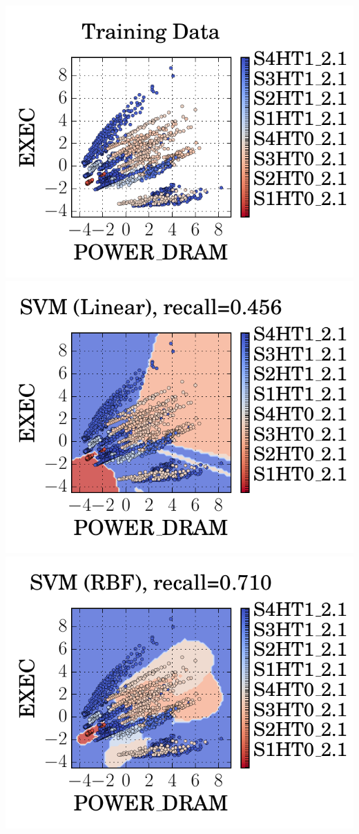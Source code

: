 \documentclass[a0,portrait]{a0poster}
\newcommand{\PAD}{\vskip 0.75cm}
\begin{document}
\begin{multicols}{2}
{
  \centering
  \includegraphics[]{figures/training_space_noclassifier.pdf}
  \includegraphics[]{figures/training_space_svm_kern_lin.pdf}
  \includegraphics[]{figures/training_space_svm.pdf}
  \label{fig:classifier-training}
\PAD
}


\end{multicols}
\end{document}
